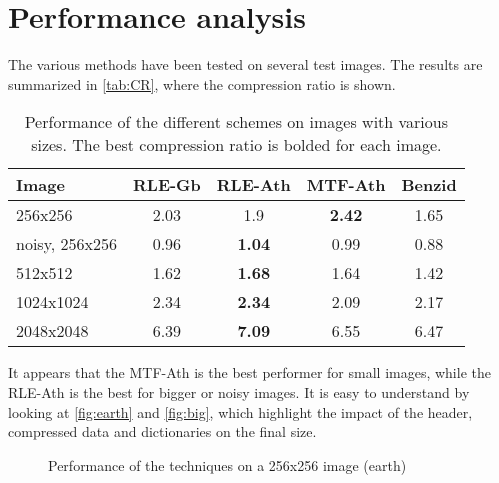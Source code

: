 \vspace{-0.5cm}
\section{Performance analysis}

The various methods have been tested on several test images. The results are summarized in \autoref{tab:CR}, where the compression ratio is shown.

\begin{table}[h]
	\centering
	\begin{tabular}{|l|cccc|}
		\hline
		Image                 &RLE-Gb & RLE-Ath & MTF-Ath & Benzid \\ \hline
		256x256 & 2.03  & 1.9 & \textbf{2.42} & 1.65      \\
		noisy, 256x256 & 0.96 & \textbf{1.04} & 0.99   & 0.88   \\
		512x512  & 1.62  & \textbf{1.68} & 1.64 & 1.42 \\
		1024x1024 & 2.34 & \textbf{2.34} & 2.09 & 2.17\\
		2048x2048 & 6.39 & \textbf{7.09} & 6.55 & 6.47 \\ \hline
	\end{tabular}
	\caption{Performance of the different schemes on images with various sizes. The best compression ratio is bolded for each image.}
	\label{tab:CR}
\end{table}

\vspace*{-0.5cm}
It appears that the MTF-Ath is the best performer for small images, while the RLE-Ath is the best for bigger or noisy images. It is easy to understand by looking at \autoref{fig:earth} and \autoref{fig:big}, which highlight the impact of the header, compressed data and dictionaries on the final size.

\begin{figure}[h]
	\centering
	\caption{Performance of the techniques on a 256x256 image (earth)}
	\label{fig:earth}
\end{figure}


